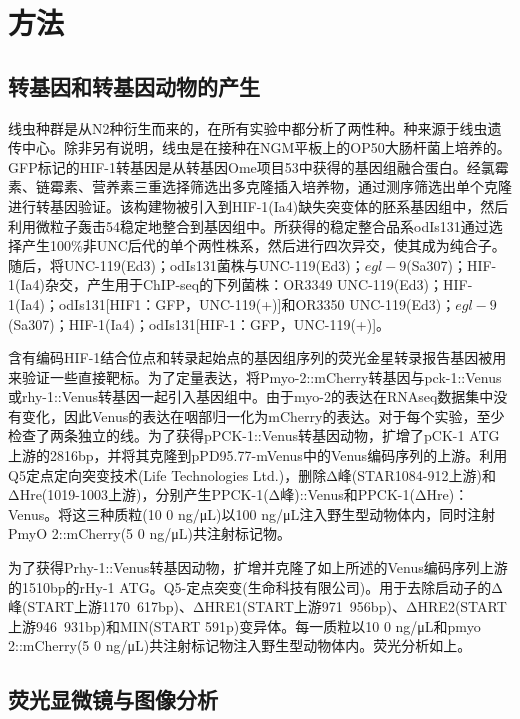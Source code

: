 \documentclass{ctexart}
\begin{document}
    \section{方法}

    \subsection{转基因和转基因动物的产生}

        线虫种群是从N2种衍生而来的，在所有实验中都分析了两性种。种来源于线虫遗传中心。除非另有说明，线虫是在接种在NGM平板上的OP50大肠杆菌上培养的。GFP标记的HIF-1转基因是从转基因Ome项目53中获得的基因组融合蛋白。经氯霉素、链霉素、营养素三重选择筛选出多克隆插入培养物，通过测序筛选出单个克隆进行转基因验证。该构建物被引入到HIF-1(Ia4)缺失突变体的胚系基因组中，然后利用微粒子轰击54稳定地整合到基因组中。所获得的稳定整合品系odIs131通过选择产生100\%非UNC后代的单个两性株系，然后进行四次异交，使其成为纯合子。随后，将UNC-119(Ed3)；odIs131菌株与UNC-119(Ed3)；$egl-9$(Sa307)；HIF-1(Ia4)杂交，产生用于ChIP-seq的下列菌株：OR3349 UNC-119(Ed3)；HIF-1(Ia4)；odIs131[HIF1：GFP，UNC-119(+)]和OR3350 UNC-119(Ed3)；$egl-9$(Sa307)；HIF-1(Ia4)；odIs131[HIF-1：GFP，UNC-119(+)]。

        含有编码HIF-1结合位点和转录起始点的基因组序列的荧光金星转录报告基因被用来验证一些直接靶标。为了定量表达，将Pmyo-2::mCherry转基因与pck-1::Venus或rhy-1::Venus转基因一起引入基因组中。由于myo-2的表达在RNAseq数据集中没有变化，因此Venus的表达在咽部归一化为mCherry的表达。对于每个实验，至少检查了两条独立的线。为了获得pPCK-1::Venus转基因动物，扩增了pCK-1 ATG上游的2816bp，并将其克隆到pPD95.77-mVenus中的Venus编码序列的上游。利用Q5定点定向突变技术(Life Technologies Ltd.)，删除Δ峰(STAR1084-912上游)和ΔHre(1019-1003上游)，分别产生PPCK-1(Δ峰)::Venus和PPCK-1(ΔHre)：Venus。将这三种质粒(10 0 ng/μL)以100 ng/μL注入野生型动物体内，同时注射PmyO 2::mCherry(5 0 ng/μL)共注射标记物。

        为了获得Prhy-1::Venus转基因动物，扩增并克隆了如上所述的Venus编码序列上游的1510bp的rHy-1 ATG。Q5-定点突变(生命科技有限公司)。用于去除启动子的Δ峰(START上游1170~617bp)、ΔHRE1(START上游971~956bp)、ΔHRE2(START上游946~931bp)和MIN(START 591p)变异体。每一质粒以10 0 ng/μL和pmyo 2::mCherry(5 0 ng/μL)共注射标记物注入野生型动物体内。荧光分析如上。

    \subsection{荧光显微镜与图像分析}
\end{document}
